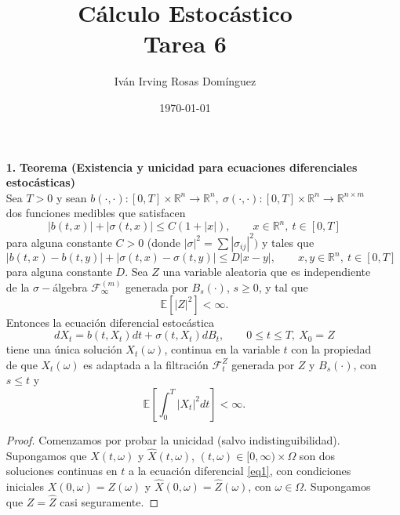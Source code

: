\documentclass[letterpaper]{article}
\title{\textbf{Cálculo Estocástico\\
Tarea 6}}
\author{Iván Irving Rosas Domínguez}
\date{\today}
\newcommand{\R}{\mathbb{R}}
\newcommand{\F}{\mathcal{F}}
\renewcommand{\to}{\rightarrow}
\newcommand{\E}{\mathbb{E}}
\newcommand{\1}{\mathds{1}}
\theoremstyle{definition}
\theoremstyle{definition}
\theoremstyle{definition}
\theoremstyle{definition}
\theoremstyle{definition}
\begin{document}
\maketitle


\begin{enumerate}
    \item[\textbf{1.}] \textbf{Teorema (Existencia y unicidad para ecuaciones diferenciales estocásticas)}\\
    
    Sea $T>0$ y sean $b(\cdot, \cdot):[0,T]\times \R^{n}\to \R^{n}, \ \sigma(\cdot, \cdot):[0,T]\times \R^{n}\to \R^{n\times m}$ dos
    funciones medibles que satisfacen 
    \[
    |b(t,x)|+|\sigma(t,x)|\leq C(1+|x|), \qquad x\in \R^{n}, \  t\in [0,T]    
    \]
    para alguna constante $C>0$ (donde $|\sigma|^2=\sum|\sigma_{ij}|^2)$ y tales que 
    \[
    |b(t,x)-b(t,y)|+|\sigma(t,x)-\sigma(t,y)|\leq D|x-y|, \qquad x,y \in \R^{n}, \ t\in[0,T]    
    \]
    para alguna constante $D$. Sea $Z$ una variable aleatoria que es independiente de la $\sigma-$álgebra 
    $\F_\infty^{(m)}$ generada por $B_s(\cdot)$, $s\geq0$, y tal que 
    \[
        \E\left[|Z|^{2}\right]<\infty.
    \]
    Entonces la ecuación diferencial estocástica 
        \begin{equation}\label{eq1}
        dX_t=b(t,X_t)dt+\sigma(t,X_t)dB_t, \qquad 0\leq t\leq T, \ X_0=Z
    \end{equation}
        tiene una única solución $X_t(\omega)$, continua en la variable $t$ con la propiedad
    de que $X_t(\omega)$ es adaptada a la filtración $\F_t^{Z}$ generada por $Z$ y 
    $B_s(\cdot)$, con $s\leq t$ y 
    \[
    \E\left[\int_{0}^{T}|X_t|^{2}dt\right]<\infty.
    \]
    \begin{proof} 
       Comenzamos por probar la unicidad (salvo indistinguibilidad). Supongamos que $X(t,\omega)$ y $\widehat{X}(t,\omega)$, $(t,\omega)\in [0,\infty)\times \Omega$ son 
       dos soluciones continuas en $t$ a la ecuación diferencial \eqref{eq1}, con condiciones iniciales $X(0,\omega)=Z(\omega)$ y $\widehat{X}(0,\omega)=\widehat{Z}(\omega)$, 
       con $\omega \in \Omega$. Supongamos que $Z=\widehat{Z}$ casi seguramente.


\end{proof}
\end{enumerate}
\end{document}
